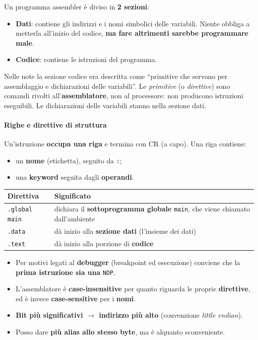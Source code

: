 \documentclass[11pt,a4paper]{article}
\begin{document}
Un programma assembler è diviso in \textbf{2 sezioni}:
\begin{itemize}[leftmargin=*]
  \item \textbf{Dati}: contiene gli indirizzi e i nomi simbolici delle variabili. Niente obbliga a metterla all'inizio del codice, \textbf{ma fare altrimenti sarebbe programmare male}.
  \item \textbf{Codice}: contiene le istruzioni del programma.
\end{itemize}

\begin{integrazione}
Nelle note la sezione codice era descritta come ``primitive che servono per assemblaggio e dichiarazioni delle variabili''. Le \emph{primitive} (o \emph{direttive}) sono comandi rivolti all'\textbf{assemblatore}, non al processore: non producono istruzioni eseguibili. Le dichiarazioni delle variabili stanno nella sezione dati.
\end{integrazione}

\paragraph*{Righe e direttive di struttura}

Un'istruzione \textbf{occupa una riga} e termina con CR (a capo). Una riga contiene:
\begin{itemize}[leftmargin=*]
  \item un \textbf{nome} (etichetta), seguito da \texttt{:};
  \item una \textbf{keyword} seguita dagli \textbf{operandi}.
\end{itemize}

\begin{center}
\begin{tabular}{l p{10cm}}
\textbf{Direttiva} & \textbf{Significato} \\ \hline
\texttt{.global main} & dichiara il \textbf{sottoprogramma globale} \texttt{main}, che viene chiamato dall'ambiente \\
\texttt{.data} & dà inizio alla \textbf{sezione dati} (l'insieme dei dati) \\
\texttt{.text} & dà inizio alla porzione di \textbf{codice} \\
\end{tabular}
\end{center}

\begin{itemize}[leftmargin=*]
  \item Per motivi legati al \textbf{debugger} (breakpoint ed esecuzione) conviene che la \textbf{prima istruzione sia una} \texttt{NOP}.
  \item L'assemblatore è \textbf{case-insensitive} per quanto riguarda le proprie \textbf{direttive}, ed è invece \textbf{case-sensitive} per i \textbf{nomi}.
  \item \textbf{Bit più significativi $\to$ indirizzo più alto} (convenzione \emph{little endian}).
  \item Posso dare \textbf{più alias allo stesso byte}, ma è alquanto sconveniente.
\end{itemize}
\end{document}
